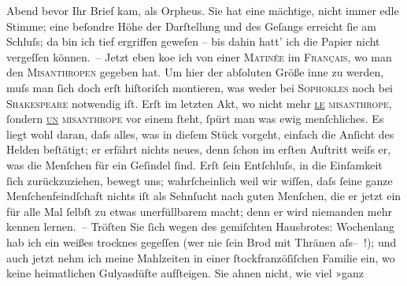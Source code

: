 \begin{ledgroupsized}[t]{13cm}
               Abend bevor Ihr Brief kam, als Orpheus. Sie hat eine {\pb}mächtige, nicht immer
               edle Stimme; eine beſondre Höhe der Darſtellung und des Geſangs erreicht ſie am
               Schluſs; da bin ich tief ergriffen geweſen – bis dahin hatt’ ich die Papier nicht vergeſſen können. –\pend
           \pstart
           Jetzt eben ko{\geminationm}e ich von einer \textsc{Matinée} im \textsc{Français}, wo man den \textsc{Misanthropen} gegeben hat. Um hier der abſoluten Größe inne zu werden, muſs man ſich doch
               erſt hiſtoriſch montieren, was weder bei \textsc{Sophokles} noch bei \textsc{Shakespeare} notwendig iſt. Erſt im letzten Akt, {\pb}wo nicht mehr
                  \textsc{\uline{le} misanthrope}, ſondern \textsc{\uline{un} misanthrope} vor einem ſteht, ſpürt man was
               ewig menſchliches. Es liegt wohl daran, daſs alles, was in dieſem Stück vorgeht, einfach die Anſicht des
               Helden beſtätigt; er erfährt nichts neues, denn ſchon im erſten Auftritt weiſs er,
               was die Menſchen für ein Geſindel ſind. Erſt ſein Entſchluſs, in die Einſamkeit ſich
               zurückzuziehen, bewegt uns; wahrſcheinlich weil wir wiſſen, daſs ſeine ganze
               Menſchenfeindſchaft nichts {\pb}iſt als Sehnſucht nach guten
               Menſchen, die er jetzt ein für alle Mal ſelbſt zu etwas unerfüllbarem macht; denn er
               wird niemanden mehr kennen lernen. –\pend
           \pstart
           Tröſten Sie ſich wegen des gemiſchten Hausbrotes: Wochenlang hab ich ein weißes
               trocknes gegeſſen (wer nie ſein Brod mit Thränen
                  aſs– !); und auch jetzt nehm ich meine Mahlzeiten in einer ſtockfranzöſiſchen Familie ein, wo keine heimatlichen {\pb}Gulyasdüfte aufſteigen. Sie ahnen nicht, wie viel »ganz

\end{ledgroupsized}
